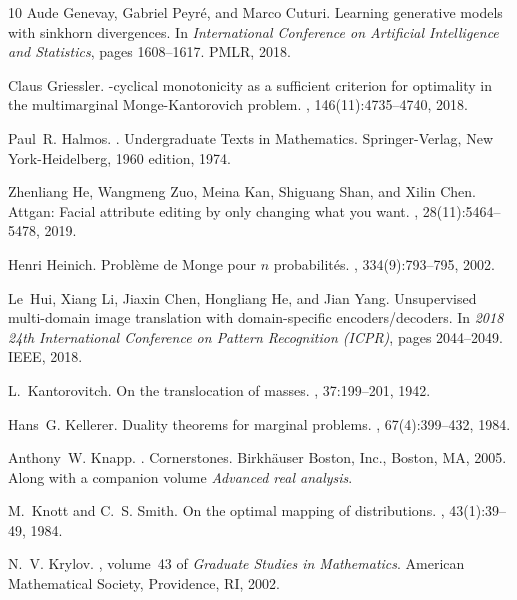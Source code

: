 \documentclass[twoside,11pt,a4paper]{article}
\begin{document}
\begin{thebibliography}{10}
Aude Genevay, Gabriel Peyr{\'e}, and Marco Cuturi.
\newblock Learning generative models with sinkhorn divergences.
\newblock In {\em International Conference on Artificial Intelligence and
  Statistics}, pages 1608--1617. PMLR, 2018.

Claus Griessler.
-cyclical monotonicity as a sufficient criterion for optimality
  in the multimarginal {M}onge-{K}antorovich problem.
, 146(11):4735--4740, 2018.

Paul~R. Halmos.
.
\newblock Undergraduate Texts in Mathematics. Springer-Verlag, New
  York-Heidelberg, 1960 edition, 1974.

Zhenliang He, Wangmeng Zuo, Meina Kan, Shiguang Shan, and Xilin Chen.
\newblock Attgan: Facial attribute editing by only changing what you want.
, 28(11):5464--5478, 2019.

Henri Heinich.
\newblock Probl\`eme de {M}onge pour {$n$} probabilit\'{e}s.
, 334(9):793--795, 2002.

Le~Hui, Xiang Li, Jiaxin Chen, Hongliang He, and Jian Yang.
\newblock Unsupervised multi-domain image translation with domain-specific
  encoders/decoders.
\newblock In {\em 2018 24th International Conference on Pattern Recognition
  (ICPR)}, pages 2044--2049. IEEE, 2018.

L.~Kantorovitch.
\newblock On the translocation of masses.
, 37:199--201, 1942.

Hans~G. Kellerer.
\newblock Duality theorems for marginal problems.
, 67(4):399--432, 1984.

Anthony~W. Knapp.
.
\newblock Cornerstones. Birkh\"{a}user Boston, Inc., Boston, MA, 2005.
\newblock Along with a companion volume {\it Advanced real analysis}.

M.~Knott and C.~S. Smith.
\newblock On the optimal mapping of distributions.
, 43(1):39--49, 1984.

N.~V. Krylov.
, volume~43 of
  {\em Graduate Studies in Mathematics}.
\newblock American Mathematical Society, Providence, RI, 2002.


\end{thebibliography}
\end{document}
